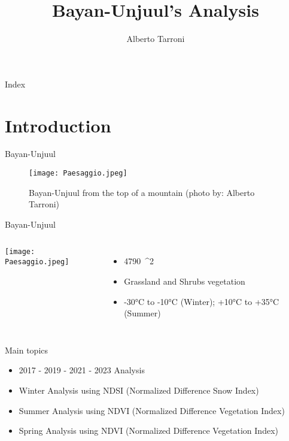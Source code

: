 \documentclass[10pt]{beamer}
\title{Bayan-Unjuul's Analysis}
\author{Alberto Tarroni}
\date{}
\begin{document}
\maketitle
\begin{frame}{Index}
\tableofcontents
\end{frame}

\section{Introduction}

\begin{frame}{Bayan-Unjuul}
    \begin{figure}
        \centering
        \texttt{[image: Paesaggio.jpeg]}
        \caption{Bayan-Unjuul from the top of a mountain \footnotesize{(photo by: Alberto Tarroni)}}
    \end{figure}
\end{frame}

\begin{frame}{Bayan-Unjuul}
    \begin{columns}
            \texttt{[image: Paesaggio.jpeg]}
            \begin{itemize}
                \item<1-> 4790\ ^2
                \item<2-> Grassland and Shrubs vegetation
                \item<3-> -30°C to -10°C (Winter); +10°C to +35°C (Summer)
            \end{itemize}
    \end{columns}
\end{frame}

\begin{frame}{Main topics}
    \begin{itemize}
        \item<1-> 2017 - 2019 - 2021 - 2023 Analysis
        \item<2-> Winter Analysis using NDSI (Normalized Difference Snow Index)
        \item<3-> Summer Analysis using NDVI (Normalized Difference Vegetation Index)
        \item<4-> Spring Analysis using NDVI (Normalized Difference Vegetation Index)
    \end{itemize}
    
\end{frame}
\end{document}
